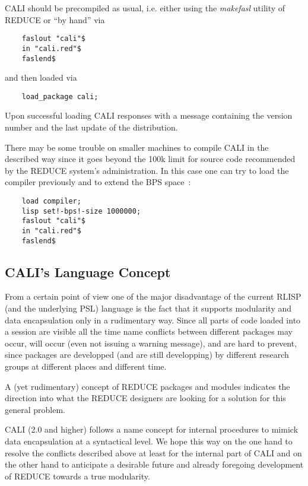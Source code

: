 CALI should be precompiled as usual, i.e. either using the {\em
makefasl} utility of REDUCE or ``by hand'' via
\begin{verbatim}
    faslout "cali"$
    in "cali.red"$
    faslend$
\end{verbatim}
and then loaded via
\begin{verbatim}
    load_package cali;
\end{verbatim}
Upon successful loading CALI responses with a message containing the
version number and the last update of the distribution. 

There may be some trouble on smaller machines to compile CALI in the
described way since it goes beyond the 100k limit for source code
recommended by the REDUCE system's administration. In this case one
can try to load the compiler previously and to extend the BPS space~:
\begin{verbatim}
    load compiler;
    lisp set!-bps!-size 1000000;
    faslout "cali"$
    in "cali.red"$
    faslend$
\end{verbatim}
\begin{center}
\end{center}

\subsection{CALI's Language Concept}

From a certain point of view one of the major disadvantage of the
current RLISP (and the underlying PSL) language is the fact
that it supports modularity and data encapsulation only in a
rudimentary way.  Since all parts of code loaded into a session are
visible all the time name conflicts between different packages may
occur, will occur (even not issuing a warning message), and are hard
to prevent, since packages are developped (and are still developping)
by different research groups at different places and different time.

A (yet rudimentary) concept of REDUCE packages and modules indicates the
direction into what the REDUCE designers are looking for a solution
for this general problem.
\medskip

CALI (2.0 and higher) follows a name concept for internal procedures
to mimick data encapsulation at a syntactical level. We hope this way
on the one hand to resolve the conflicts described above at least for
the internal part of CALI and on the other hand to anticipate a
desirable future and already foregoing development of REDUCE towards
a true modularity.


